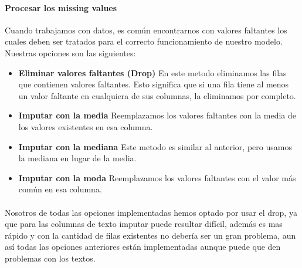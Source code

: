 \documentclass{report}
\begin{document}
                \paragraph*{Procesar los missing values} 
                { 
                    Cuando trabajamos con datos, es común encontrarnos con valores faltantes los cuales deben ser tratados para el correcto funcionamiento de nuestro modelo. 
                    Nuestras opciones son las siguientes:
                }
                \begin{itemize}
                    \item \textbf{Eliminar valores faltantes (Drop)}  
                    {En este metodo eliminamos las filas que contienen valores faltantes. Esto significa que si una fila tiene al menos un valor faltante en cualquiera de sus columnas, la eliminamos por completo.}
                    \item \textbf{Imputar con la media}  
                      {Reemplazamos los valores faltantes con la media de los valores existentes en esa columna.}
                    \item \textbf{Imputar con la mediana}  
                      {Este metodo es similar al anterior, pero usamos la mediana en lugar de la media.}
                    \item \textbf{Imputar con la moda}  
                      { Reemplazamos los valores faltantes con el valor más común en esa columna.}
                \end{itemize}
                \paragraph*{}{
                    Nosotros de todas las opciones implementadas hemos optado por usar el drop, ya que para las columnas de texto imputar puede resultar difícil, además es mas rápido y con la cantidad de filas existentes no debería ser un gran problema, aun así todas las opciones anteriores están implementadas aunque puede que den problemas con los textos.
                }
\end{document}
